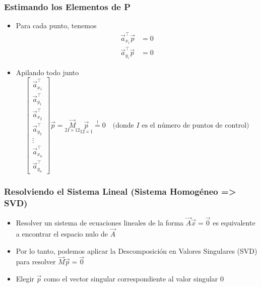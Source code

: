 \begin{frame}
  \frametitle{Estimando los Elementos de P}

  \begin{itemize}
    \item Para cada punto, tenemos
    \begin{align*}
        \vec{a}_{x_i}^{\top} \vec{p} &= 0 \\
        \vec{a}_{y_i}^{\top} \vec{p} &= 0
    \end{align*}
    \item Apilando todo junto
    \begin{equation*}
      \begin{bmatrix}
        \vec{a}_{x_1}^{\top} \\
        \vec{a}_{y_1}^{\top} \\
        \vec{a}_{x_2}^{\top} \\
        \vec{a}_{y_2}^{\top} \\
        \vdots \\
        \vec{a}_{x_n}^{\top} \\
        \vec{a}_{y_n}^{\top}
      \end{bmatrix} \vec{p} = \underset{2I\times 12}{\vec{M}} \underset{12\times1}{\vec{p}} \stackrel{!}{=} 0 \quad \text{(donde $I$ es el número de puntos de control)}
    \end{equation*}
  \end{itemize}

\end{frame}


\begin{frame}
  \frametitle{Resolviendo el Sistema Lineal (Sistema Homogéneo => SVD)}
  \begin{itemize}
    \item Resolver un sistema de ecuaciones lineales de la forma $\vec{A}\vec{x} = \vec{0}$ es equivalente a encontrar el espacio nulo de $\vec{A}$
    \item Por lo tanto, podemos aplicar la Descomposición en Valores Singulares (SVD) para resolver $\vec{M}\vec{p} = \vec{0}$
    \item Elegir $\vec{p}$ como el vector singular correspondiente al valor singular 0
  \end{itemize}
\end{frame}

